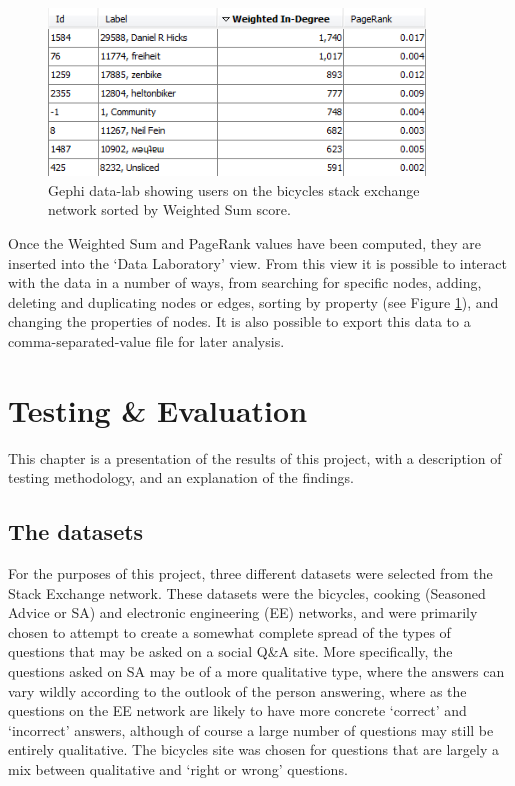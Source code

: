 \documentclass[]{final_report}
\begin{document}
\begin{figure}[ht!]
\centering
\includegraphics[width=100mm]{chap4/gephidata.PNG}
\caption{Gephi data-lab showing users on the bicycles stack exchange network sorted by Weighted Sum score.}
\label{gra:gephidata}
\end{figure}

Once the Weighted Sum and PageRank values have been computed, they are inserted into the `Data Laboratory' view. From this view it is possible to interact with the data in a number of ways, from searching for specific nodes, adding, deleting and duplicating nodes or edges, sorting by property (see Figure \ref{gra:gephidata}), and changing the properties of nodes. It is also possible to export this data to a comma-separated-value file for later analysis.


\chapter{Testing \& Evaluation}

This chapter is a presentation of the results of this project, with a description of testing methodology, and an explanation of the findings.

\section{The datasets}

For the purposes of this project, three different datasets were selected from the Stack Exchange network. These datasets were the bicycles, cooking (Seasoned Advice or SA) and electronic engineering (EE) networks, and were primarily chosen to attempt to create a somewhat complete spread of the types of questions that may be asked on a social Q\&A site. More specifically, the questions asked on SA may be of a more qualitative type, where the answers can vary wildly according to the outlook of the person answering, where as the questions on the EE network are likely to have more concrete `correct' and `incorrect' answers, although of course a large number of questions may still be entirely qualitative. The bicycles site was chosen for questions that are largely a mix between qualitative and `right or wrong' questions.
\end{document}
